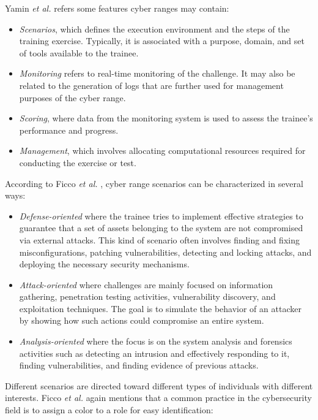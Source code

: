 Yamin \textit{et al.} \cite{cr_and_security_testbeds_ref} refers some features cyber ranges may contain:

\begin{itemize}
    \item \textit{Scenarios}, which defines the execution environment and the steps of the training exercise. Typically, it is associated with a purpose, domain, and set of tools available to the trainee.
    \item \textit{Monitoring} refers to real-time monitoring of the challenge. It may also be related to the generation of logs that are further used for management purposes of the cyber range.
    \item \textit{Scoring}, where data from the monitoring system is used to assess the trainee's performance and progress. 
    \item \textit{Management}, which involves allocating computational resources required for conducting the exercise or test. 
\end{itemize}

According to Ficco \textit{et al.} \cite{leaf_ref}, cyber range scenarios can be characterized in several ways:

\begin{itemize}
    \item \textit{Defense-oriented} where the trainee tries to implement effective strategies to guarantee that a set of assets belonging to the system are not compromised via external attacks. This kind of scenario often involves finding and fixing misconfigurations, patching vulnerabilities, detecting and locking attacks, and deploying the necessary security mechanisms.
    \item \textit{Attack-oriented} where challenges are mainly focused on information gathering, penetration testing activities, vulnerability discovery, and exploitation techniques. The goal is to simulate the behavior of an attacker by showing how such actions could compromise an entire system.
    \item \textit{Analysis-oriented} where the focus is on the system analysis and forensics activities such as detecting an intrusion and effectively responding to it, finding vulnerabilities, and finding evidence of previous attacks.
\end{itemize}

Different scenarios are directed toward different types of individuals with different interests. Ficco \textit{et al.} \cite{leaf_ref} again mentions that a common practice in the cybersecurity field is to assign a color to a role for easy identification:

